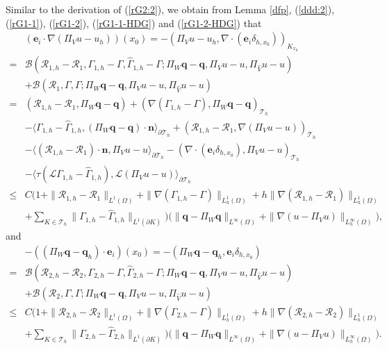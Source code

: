 \documentclass[1996/10/24]{amsart}
\theoremstyle{definition}
\numberwithin{equation}{section}
\begin{document}
Similar to the derivation of (\ref{rG2:2}), we obtain from Lemma \ref{dfp}, (\ref{ddd:2}), (\ref{rG1-1}), (\ref{rG1-2}), (\ref{rG1-1-HDG}) and (\ref{rG1-2-HDG}) that
\begin{align}
&\left({\bm e}_i\cdot\nabla(\Pi_Vu-u_h)\right)(x_0)=-(\Pi_Vu-u_h,\nabla\cdot({\bm e}_i\delta_{h,x_0}))_{K_{x_0}}\nonumber\\
=&\mathcal{B}(\boldsymbol{\mathcal{R}}_{1,h}-\boldsymbol{\mathcal{R}}_1,\Gamma_{1,h}-\Gamma,\widehat{\Gamma}_{1,h}-\Gamma;\Pi_W{\bm q}-{\bm q},\Pi_Vu-u,\Pi_{\widehat{V}}u-u)\nonumber\\
&+\mathcal{B}(\boldsymbol{\mathcal{R}}_1,\Gamma,\Gamma;\Pi_W{\bm q}-{\bm q},\Pi_Vu-u,\Pi_{\widehat{V}}u-u)\nonumber\\
=&(\boldsymbol{\mathcal{R}}_{1,h}-\boldsymbol{\mathcal{R}}_1,\Pi_W{\bm q}-{\bm q})+(\nabla(\Gamma_{1,h}-\Gamma),\Pi_W{\bm q}-{\bm q})_{\mathcal{T}_h}\nonumber\\
&-\langle\Gamma_{1,h}-\widehat{\Gamma}_{1,h},(\Pi_W{\bm q}-{\bm q})\cdot{\bm n}\rangle_{\partial\mathcal{T}_h}+
(\boldsymbol{\mathcal{R}}_{1,h}-\boldsymbol{\mathcal{R}}_1,\nabla(\Pi_Vu-u))_{\mathcal{T}_h}\label{rG1-1:1}\\
&-\langle(\boldsymbol{\mathcal{R}}_{1,h}-\boldsymbol{\mathcal{R}}_1)\cdot{\bm n},\Pi_Vu-u\rangle_{\partial\mathcal{T}_h}-(\nabla\cdot({\bm e}_i\delta_{h,x_0}),
\Pi_Vu-u)_{\mathcal{T}_h}\nonumber\\
&-\langle\tau(\mathcal{L}\Gamma_{1,h}-\widehat{\Gamma}_{1,h}),\mathcal{L}(\Pi_Vu-u)\rangle_{\partial\mathcal{T}_h}\nonumber\\
\leq&C\Big(1+\|\boldsymbol{\mathcal{R}}_{1,h}-\boldsymbol{\mathcal{R}}_1\|_{L^1(\Omega)}+\|\nabla(\Gamma_{1,h}-\Gamma)\|_{L_h^1(\Omega)}
+h\|\nabla(\boldsymbol{\mathcal{R}}_{1,h}-\boldsymbol{\mathcal{R}}_1)\|_{L_h^1(\Omega)}\nonumber\\
&+\sum_{K\in\mathcal{T}_h}\|\Gamma_{1,h}-\widehat{\Gamma}_{1,h}\|_{L^1(\partial K)}\Big)\Big(\|{\bm q}-\Pi_W{\bm q}\|_{L^{\infty}(\Omega)}+
\|\nabla(u-\Pi_Vu)\|_{L^{\infty}_h(\Omega)}\Big),\nonumber
\end{align}
and
\begin{align}
&-((\Pi_W{\bm q}-{\bm q}_h)\cdot{\bm e}_i)(x_0)=-(\Pi_W{\bm q}-{\bm q}_h,{\bm e}_i\delta_{h,x_0})\nonumber\\
=&\mathcal{B}(\boldsymbol{\mathcal{R}}_{2,h}-\boldsymbol{\mathcal{R}}_2,\Gamma_{2,h}-\Gamma,\widehat{\Gamma}_{2,h}-\Gamma;\Pi_W{\bm q}-{\bm q},\Pi_Vu-u,\Pi_{\widehat{V}}u-u)\nonumber\\
&+\mathcal{B}(\boldsymbol{\mathcal{R}}_2,\Gamma,\Gamma;\Pi_W{\bm q}-{\bm q},\Pi_Vu-u,\Pi_{\widehat{V}}u-u)\nonumber\\
\leq& C\Big(1+\|\boldsymbol{\mathcal{R}}_{2,h}-\boldsymbol{\mathcal{R}}_2\|_{L^1(\Omega)}+\|\nabla(\Gamma_{2,h}-\Gamma)\|_{L_h^1(\Omega)}
+h\|\nabla(\boldsymbol{\mathcal{R}}_{2,h}-\boldsymbol{\mathcal{R}}_2)\|_{L_h^1(\Omega)}\label{rG1-2:1}\\
&+\sum_{K\in\mathcal{T}_h}\|\Gamma_{2,h}-\widehat{\Gamma}_{2,h}\|_{L^1(\partial K)}\Big)\Big(\|{\bm q}-\Pi_W{\bm q}\|_{L^{\infty}(\Omega)}+
\|\nabla(u-\Pi_Vu)\|_{L^{\infty}_h(\Omega)}\Big).\nonumber
\end{align}
\end{document}
